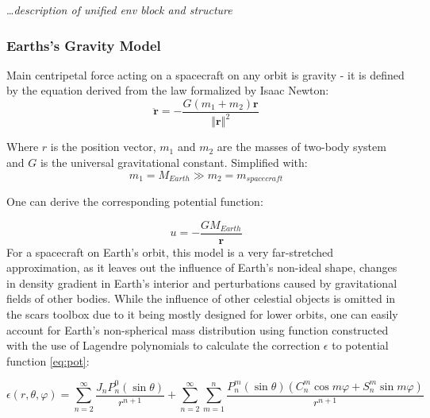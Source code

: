     \dots\textit{description of unified env block and structure}
        
    \subsubsection{Earths's Gravity Model}
        Main centripetal force acting on a spacecraft on any orbit is gravity - it is defined by the equation derived from the law formalized by Isaac Newton:
        \begin{equation}
            \ddot{\textbf{r}} = -\frac{G(m_1+m_2)\textbf{r}}{\left\Vert \textbf{r} \right\Vert^2}
        \end{equation}

        Where $r$ is the position vector, $m_1$ and $m_2$ are the masses of two-body system and $G$ is the universal gravitational constant. Simplified with:
        \begin{equation}
            m_1 = M_{Earth} \gg m_2 = m_{spacecraft}
        \end{equation}

        One can derive the corresponding potential function:
        
        \begin{equation}
            u = -\frac{GM_{Earth}}{\textbf{r}}\label{eq:pot}
        \end{equation}
        For a spacecraft on Earth's orbit, this model is a very far-stretched approximation, as it leaves out the influence of Earth's non-ideal shape, changes in density gradient in Earth's interior and perturbations caused by gravitational fields of other bodies. While the influence of other celestial objects is omitted in the \ac{scars} toolbox due to it being mostly designed for lower orbits, one can easily account for Earth's non-spherical mass distribution using function constructed with the use of Lagendre polynomials to calculate the correction $\epsilon$ to potential function \eqref{eq:pot}:

        \begin{equation}
            \epsilon(r, \theta, \varphi) = \sum_{n=2}^{\infty}  \frac{J_n P^0_n(\sin\theta) }{r^{n+1}} + \sum_{n=2}^{\infty} \sum_{m=1}^n \frac{ P^m_n(\sin\theta) (C_n^m \cos m\varphi + S_n^m \sin m\varphi)}{r^{n+1}}\label{eq:geopot}
        \end{equation}

